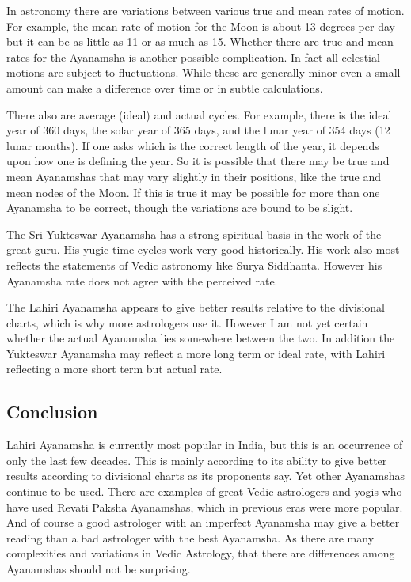  

In astronomy there are variations between various true and mean rates of motion. For example, the mean rate of motion for the Moon is about 13 degrees per day but it can be as little as 11 or as much as 15. Whether there are true and mean rates for the Ayanamsha is another possible complication. In fact all celestial motions are subject to fluctuations. While these are generally minor even a small amount can make a difference over time or in subtle calculations.

 

There also are average (ideal) and actual cycles. For example, there is the ideal year of 360 days, the solar year of 365 days, and the lunar year of 354 days (12 lunar months). If one asks which is the correct length of the year, it depends upon how one is defining the year. So it is possible that there may be true and mean Ayanamshas that may vary slightly in their positions, like the true and mean nodes of the Moon. If this is true it may be possible for more than one Ayanamsha to be correct, though the variations are bound to be slight.

 

The Sri Yukteswar Ayanamsha has a strong spiritual basis in the work of the great guru. His yugic time cycles work very good historically. His work also most reflects the statements of Vedic astronomy like Surya Siddhanta. However his Ayanamsha rate does not agree with the perceived rate.

 

The Lahiri Ayanamsha appears to give better results relative to the divisional charts, which is why more astrologers use it. However I am not yet certain whether the actual Ayanamsha lies somewhere between the two. In addition the Yukteswar Ayanamsha may reflect a more long term or ideal rate, with Lahiri reflecting a more short term but actual rate.

 

\subsection{Conclusion}

 

Lahiri Ayanamsha is currently most popular in India, but this is an occurrence of only the last few decades. This is mainly according to its ability to give better results according to divisional charts as its proponents say. Yet other Ayanamshas continue to be used. There are examples of great Vedic astrologers and yogis who have used Revati Paksha Ayanamshas, which in previous eras were more popular. And of course a good astrologer with an imperfect Ayanamsha may give a better reading than a bad astrologer with the best Ayanamsha. As there are many complexities and variations in Vedic Astrology, that there are differences among Ayanamshas should not be surprising.

